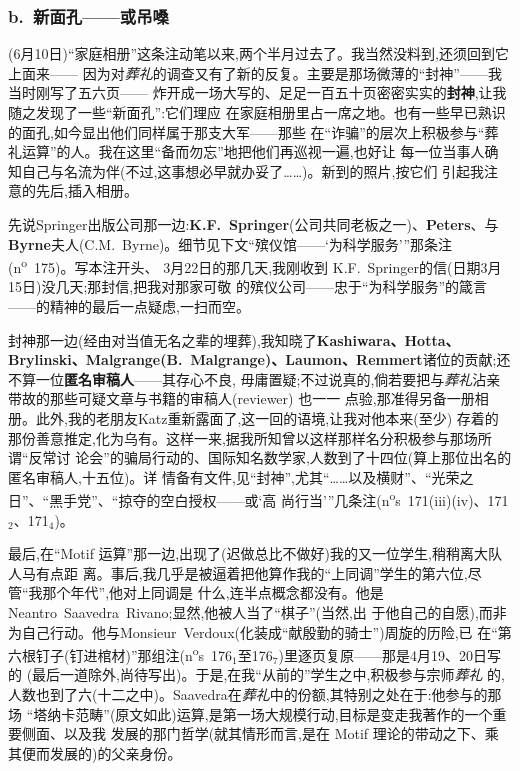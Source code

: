 \subsubsection*{b.\ 新面孔——或吊嗓}

(6月10日)“家庭相册”这条注动笔以来,两个半月过去了。我当然没料到,还须回到它上面来——
因为对\emph{葬礼}的调查又有了新的反复。主要是那场微薄的“封神”——我当时刚写了五六页——
炸开成一场大写的、足足一百五十页密密实实的\textbf{封神},让我随之发现了一些“新面孔”:它们理应
在家庭相册里占一席之地。也有一些早已熟识的面孔,如今显出他们同样属于那支大军——那些
在“诈骗”的层次上积极参与“葬礼运算”的人。我在这里“备而勿忘”地把他们再巡视一遍\dmark{},也好让
每一位当事人确知自己与名流为伴(不过,这事想必早就办妥了……)。新到的照片,按它们
引起我注意的先后,插入相册。

先说Springer出版公司那一边:\textbf{K.F.~Springer}(公司共同老板之一)、\textbf{Peters}、与
\textbf{Byrne}夫人(C.M.~Byrne)。细节见下文“殡仪馆——‘为科学服务’”那条注(n\textsuperscript{o}~175)。写本注开头、
3月22日的那几天,我刚收到 K.F.~Springer的信(日期3月15日)没几天;那封信,把我对那家可敬
的殡仪公司——忠于“为科学服务”的箴言——的精神的最后一点疑虑,一扫而空。

封神那一边(经由对当值无名之辈的埋葬),我知晓了\textbf{Kashiwara、Hotta、Brylinski、Malgrange(B.~Malgrange)、Laumon、Remmert}诸位的贡献;还不算一位\textbf{匿名审稿人}——其存心不良,
毋庸置疑;不过说真的,倘若要把与\emph{葬礼}沾亲带故的那些可疑文章与书籍的审稿人(reviewer) 也一一
点验,那准得另备一册相册。此外,我的老朋友Katz重新露面了,这一回的语境,让我对他本来(至少)
存着的那份善意推定,化为乌有。这样一来,据我所知曾以这样那样名分积极参与那场所谓“反常讨
论会”的骗局行动的、国际知名数学家,人数到了十四位(算上那位出名的匿名审稿人,十五位)。详
情备有文件,见“封神”,尤其“……以及横财”、“光荣之日”、“黑手党”、“掠夺的空白授权——或‘高
尚行当’”几条注(n\textsuperscript{o}s~171(iii)(iv)、171$_{2}$、171$_{4}$)。

最后,在“Motif 运算”那一边,出现了(迟做总比不做好)我的又一位学生,稍稍离大队人马有点距
离。事后,我几乎是被逼着把他算作我的“上同调”学生的第六位,尽管“我那个年代”,他对上同调是
什么,连半点概念都没有。他是Neantro~Saavedra~Rivano;显然,他被人当了“棋子”(当然,出
于他自己的自愿),而非为自己行动。他与Monsieur~Verdoux(化装成“献殷勤的骑士”)\dmark{}周旋的历险,已
在“第六根钉子(钉进棺材)”那组注(n\textsuperscript{o}s~176$_{1}$至176$_{7}$)里逐页复原——那是4月19、20日写的
(最后一道除外,尚待写出)。于是,在我“从前的”学生之中,积极参与宗师\emph{葬礼}
的,人数也到了六(十二之中)。Saavedra在\emph{葬礼}中的份额,其特别之处在于:他参与的那场
“塔纳卡范畴”(原文如此)运算,是第一场大规模行动,目标是变走我著作的一个重要侧面、以及我
发展的那门哲学(就其情形而言,是在 Motif 理论的带动之下、乘其便而发展的)的父亲身份。

